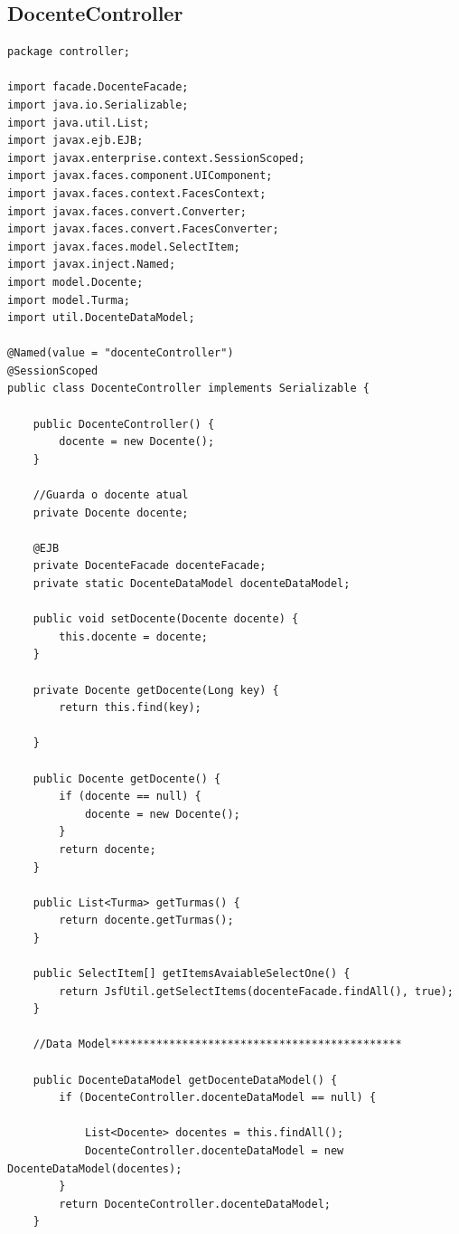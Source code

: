\documentclass[12pt,a4paper]{article}
\begin{document}
\subsection{DocenteController}
\label{subsectionDocenteController}
\begin{lstlisting}
package controller;

import facade.DocenteFacade;
import java.io.Serializable;
import java.util.List;
import javax.ejb.EJB;
import javax.enterprise.context.SessionScoped;
import javax.faces.component.UIComponent;
import javax.faces.context.FacesContext;
import javax.faces.convert.Converter;
import javax.faces.convert.FacesConverter;
import javax.faces.model.SelectItem;
import javax.inject.Named;
import model.Docente;
import model.Turma;
import util.DocenteDataModel;

@Named(value = "docenteController")
@SessionScoped
public class DocenteController implements Serializable {

    public DocenteController() {
        docente = new Docente();
    }

    //Guarda o docente atual
    private Docente docente;

    @EJB
    private DocenteFacade docenteFacade;
    private static DocenteDataModel docenteDataModel;

    public void setDocente(Docente docente) {
        this.docente = docente;
    }

    private Docente getDocente(Long key) {
        return this.find(key);

    }

    public Docente getDocente() {
        if (docente == null) {
            docente = new Docente();
        }
        return docente;
    }

    public List<Turma> getTurmas() {
        return docente.getTurmas();
    }

    public SelectItem[] getItemsAvaiableSelectOne() {
        return JsfUtil.getSelectItems(docenteFacade.findAll(), true);
    }

    //Data Model*********************************************
    
    public DocenteDataModel getDocenteDataModel() {
        if (DocenteController.docenteDataModel == null) {
           
            List<Docente> docentes = this.findAll();
            DocenteController.docenteDataModel = new DocenteDataModel(docentes);
        }
        return DocenteController.docenteDataModel;
    }


\end{lstlisting}
\end{document}
